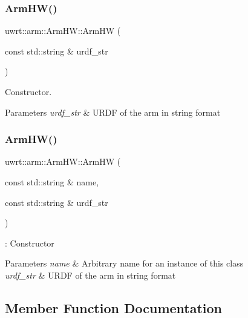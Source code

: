 \subsubsection{\texorpdfstring{Arm\+H\+W()}{ArmHW()}\hspace{0.1cm}{\footnotesize\ttfamily [1/2]}}
{\footnotesize\ttfamily uwrt\+::arm\+::\+Arm\+H\+W\+::\+Arm\+HW (\begin{DoxyParamCaption}\item[{const std\+::string \&}]{urdf\+\_\+str }\end{DoxyParamCaption})\hspace{0.3cm}{\ttfamily [explicit]}}



Constructor. 


\begin{DoxyParams}{Parameters}
{\em urdf\+\_\+str} & U\+R\+DF of the arm in string format \\
\hline
\end{DoxyParams}
\mbox{\label{classuwrt_1_1arm_1_1_arm_h_w_a03495dca1c1616fb09184541713f0670}} 
\subsubsection{\texorpdfstring{Arm\+H\+W()}{ArmHW()}\hspace{0.1cm}{\footnotesize\ttfamily [2/2]}}
{\footnotesize\ttfamily uwrt\+::arm\+::\+Arm\+H\+W\+::\+Arm\+HW (\begin{DoxyParamCaption}\item[{const std\+::string \&}]{name,  }\item[{const std\+::string \&}]{urdf\+\_\+str }\end{DoxyParamCaption})}



\+: Constructor 


\begin{DoxyParams}{Parameters}
{\em name} & Arbitrary name for an instance of this class \\
\hline
{\em urdf\+\_\+str} & U\+R\+DF of the arm in string format \\
\hline
\end{DoxyParams}


\subsection{Member Function Documentation}
\mbox{\label{classuwrt_1_1arm_1_1_arm_h_w_ae5bbb33ef19c7e27fa0e3888fda5b372}} 
